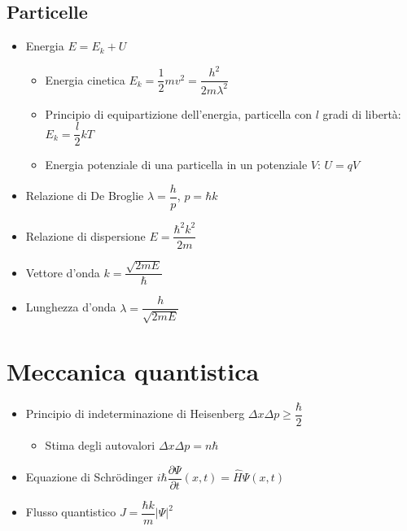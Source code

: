 \documentclass[9pt]{extarticle}
\begin{document}
\subsection{Particelle}
\begin{itemize}
  \item Energia \( E = E_k + U \)
        \begin{itemize}
          \item Energia cinetica \( E_k = \dfrac{1}{2} m v ^ 2 = \dfrac{h ^ 2}{2 m \lambda ^ 2 }\)
          \item Principio di equipartizione dell'energia, particella con \( l \) gradi di libertà: \( E_k = \dfrac{l}{2} k T \)
          \item Energia potenziale di una particella in un potenziale \( V \): \( U = qV \)
        \end{itemize}
  \item Relazione di De Broglie \( \lambda = \dfrac{h}{p} \), \( p = \hbar k \)
  \item Relazione di dispersione \( E = \dfrac{\hbar ^ 2 k ^ 2}{2 m} \)
  \item Vettore d'onda \( \displaystyle k = \dfrac{\sqrt{2mE}}{\hbar} \)
  \item Lunghezza d'onda \( \displaystyle \lambda = \dfrac{h}{\sqrt{2mE}} \)
\end{itemize}

\newpage

\section{Meccanica quantistica}
\begin{itemize}
  \item Principio di indeterminazione di Heisenberg \( \Delta x \Delta p \geq \dfrac{\hbar}{2} \)
        \begin{itemize}
          \item Stima degli autovalori \( \Delta x \Delta p = n \hbar \)
        \end{itemize}
  \item Equazione di Schrödinger \( i \hbar \dfrac{\partial \Psi}{\partial t} (x, t) = \hat{H} \Psi (x,t) \)
  \item Flusso quantistico \( J = \dfrac{\hbar k}{m} \left| \Psi \right| ^ 2 \)
\end{itemize}
\end{document}
